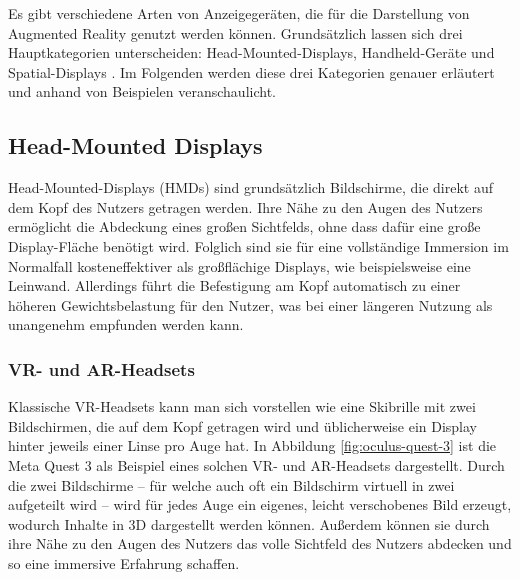  Es gibt verschiedene Arten von Anzeigegeräten, die für die Darstellung von Augmented Reality genutzt werden können.
  Grundsätzlich lassen sich drei Hauptkategorien unterscheiden: Head-Mounted-Displays, Handheld-Geräte und Spatial-Displays \autocite[][S. 346]{Carmigniani2011}.
  Im Folgenden werden diese drei Kategorien genauer erläutert und anhand von Beispielen veranschaulicht.

  \newpage

  \subsection{Head-Mounted Displays}
    \label{section:hmds}
    Head-Mounted-Displays (HMDs) sind grundsätzlich Bildschirme, die direkt auf dem Kopf des Nutzers getragen werden.
    Ihre Nähe zu den Augen des Nutzers ermöglicht die Abdeckung eines großen Sichtfelds, ohne dass dafür eine große Display-Fläche benötigt wird.
    Folglich sind sie für eine vollständige Immersion im Normalfall kosteneffektiver als großflächige Displays, wie beispielsweise eine Leinwand.
    Allerdings führt die Befestigung am Kopf automatisch zu einer höheren Gewichtsbelastung für den Nutzer, was bei einer längeren Nutzung als unangenehm empfunden werden kann.


    \subsubsection{VR- und AR-Headsets}

    Klassische VR-Headsets kann man sich vorstellen wie eine Skibrille mit zwei Bildschirmen, die auf dem Kopf getragen wird und üblicherweise ein Display hinter jeweils einer Linse pro Auge hat.
    In Abbildung \ref{fig:oculus-quest-3} ist die Meta Quest 3 als Beispiel eines solchen VR- und AR-Headsets dargestellt.
    Durch die zwei Bildschirme -- für welche auch oft ein Bildschirm virtuell in zwei aufgeteilt wird -- wird für jedes Auge ein eigenes, leicht verschobenes Bild erzeugt, wodurch Inhalte in 3D dargestellt werden können.
    Außerdem können sie durch ihre Nähe zu den Augen des Nutzers das volle Sichtfeld des Nutzers abdecken und so eine immersive Erfahrung schaffen.

